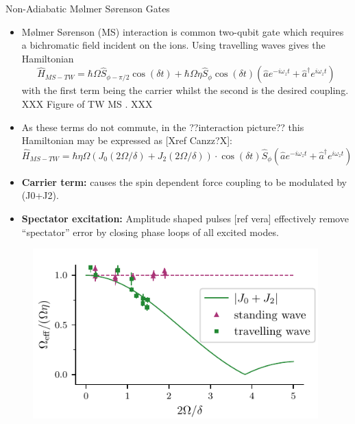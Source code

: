\documentclass[final]{beamer}
\begin{document}
\begin{frame}{}
\begin{center}
\begin{columns}[t]
\begin{column}{0.49\textwidth}
\begin{alertblock}{Non-Adiabatic Mølmer Sørenson Gates}
\begin{itemize}
      \item Mølmer Sørenson (MS) interaction is common two-qubit gate which requires a
      bichromatic field incident on the ions. Using travelling
      waves gives the Hamiltonian
      \Large$$ \hat{H}_{MS-TW} = \hbar\Omega \hat{S}_{\phi-\pi/2}\cos{(\delta t)} + \hbar\Omega\eta \hat{S}_\phi\cos{(\delta t)}(\hat{a}e^{-i\omega_zt} + \hat{a}^\dagger e^{i\omega_zt})$$\normalsize
      \vspace{0.4em}
      with the first term being the carrier whilst the second is the desired coupling.\vspace{0.8em} 
        XXX Figure of TW MS . XXX

      \item As these terms do not commute, in the ??interaction picture?? this Hamiltonian
            may be expressed as [Xref Canzz?X]:
      \Large$$ \hat{H}_{MS-TW} = \hbar\eta\Omega(J_0(2\Omega/\delta) + J_2(2\Omega/\delta))\cdot \cos{(\delta t)}\hat{S}_{\phi}(\hat{a}e^{-i\omega_zt} + \hat{a}^\dagger e^{i\omega_zt})$$\normalsize
      \end{itemize}
      \begin{minipage}{0.58\textwidth}
      \begin{itemize}
      \item \textbf{Carrier term:} causes the spin dependent force
        coupling to be modulated by (J0+J2).

      \item \textbf{Spectator excitation:} Amplitude shaped pulses
        [ref vera] effectively remove ``spectator'' error by closing
        phase loops of all excited modes.
        
      \end{itemize}
      \end{minipage}
      \begin{minipage}{0.38\textwidth}
      \begin{figure}
        \includegraphics[width=0.98\textwidth]{./figs/J0J2.pdf}
      \end{figure}
      \end{minipage}


\end{alertblock}
\end{column}
\end{columns}
\end{center}
\end{frame}
\end{document}
